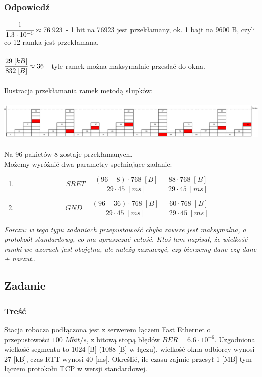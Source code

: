 		\subsubsection{Odpowiedź}
			$ \cfrac{1}{1.3\cdot 10^{-5}}\approx 76\;923 $ - 1 bit na 76923 jest przekłamany, ok. 1 bajt na 9600 B, czyli co 12 ramka jest przekłamana.\\\\
			$ \cfrac{29\;[kB]}{832\;[B]}\approx 36 $ - tyle ramek można maksymalnie przesłać do okna.\\\\
			Ilustracja przekłamania ramek metodą słupków:\\\\
			\includegraphics[width=16.0cm]{./images/zadanie08.pdf}\\\\
			Na 96 pakietów 8 zostaje przekłamanych.\\
			Możemy wyróżnić dwa parametry spełniające zadanie:
			\begin{enumerate}
				\item $$ SRET=\frac{(96-8)\cdot 768\;[B]}{29\cdot 45\;[ms]}=\frac{88\cdot 768\;[B]}{29\cdot 45\;[ms]} $$
				\item $$ GND=\frac{(96-36)\cdot 768\;[B]}{29\cdot 45\;[ms]}=\frac{60\cdot 768\;[B]}{29\cdot 45\;[ms]} $$
			\end{enumerate}
			\small{ \emph{Forczu: w tego typu zadaniach przepustowość chyba zawsze jest maksymalna, a protokoół standardowy, co ma upraszczać całość.
			Ktoś tam napisał, że wielkość ramki we wzorach jest obojętna, ale należy zaznaczyć, czy bierzemy dane czy dane + narzut.}}.
\newpage
	\subsection{Zadanie}
		\subsubsection{Treść}
			Stacja robocza podłączona jest z serwerem łączem Fast Ethernet o przepustowości $100\;Mbit/s $, z bitową stopą błędów $ BER=6.6\cdot 10^{-6} $. Uzgodniona wielkość segmentu to 1024 [B] (1088 [B] w łączu), wielkość okna odbiorcy wynosi 27 [kB], czas RTT wynosi 40 [ms]. Określić, ile czasu zajmie przesył 1 [MB] tym łączem protokołu TCP w wersji standardowej.
